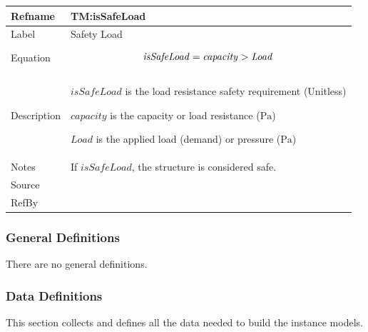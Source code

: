 \documentclass[12pt]{article}
\newcommand{\gt}{\ensuremath >}
\begin{document}
\medskip
\noindent
\begin{minipage}{\textwidth}
\begin{tabular}{>{\raggedright}p{}>{\raggedright\arraybackslash}p{}}
\toprule \textbf{Refname} & \textbf{TM:isSafeLoad}
\label{TM:isSafeLoad}
\\ \midrule
Label & Safety Load
        
\\ \midrule
Equation & \begin{displaymath}
           \mathit{isSafeLoad}=\mathit{capacity}\gt{}\mathit{Load}
           \end{displaymath}
\\ \midrule
Description & \begin{symbDescription}
              \item{$\mathit{isSafeLoad}$ is the load resistance safety requirement (Unitless)}
              \item{$\mathit{capacity}$ is the capacity or load resistance (${\text{Pa}}$)}
              \item{$\mathit{Load}$ is the applied load (demand) or pressure (${\text{Pa}}$)}
              \end{symbDescription}
\\ \midrule
Notes & If $\mathit{isSafeLoad}$, the structure is considered safe.
        
\\ \midrule
Source & \cite{astm2009}
         
\\ \midrule
RefBy & 
\\ \bottomrule
\end{tabular}
\end{minipage}

\subsubsection{General Definitions}
\label{Sec:GDs}
There are no general definitions.

\subsubsection{Data Definitions}
\label{Sec:DDs}
This section collects and defines all the data needed to build the instance models.
\end{document}
